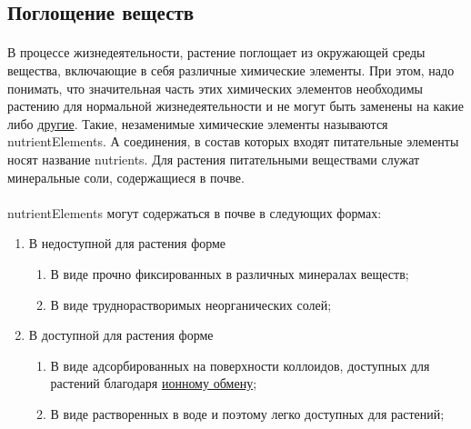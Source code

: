 \subsection*{Поглощение веществ}

\paragraph*{}В процессе жизнедеятельности, растение поглощает из окружающей среды вещества, включающие в себя различные химические элементы. При этом, надо понимать, что значительная часть этих химических элементов необходимы растению для нормальной жизнедеятельности и не могут быть заменены на какие либо \hyperlink{libihBarell}{другие}. Такие, незаменимые химические элементы называются \gls{nutrientElements}. А соединения, в состав которых входят питательные элементы носят название \gls{nutrients}. Для растения питательными веществами служат минеральные соли, содержащиеся в почве.

\paragraph*{}\gls{nutrientElements} могут содержаться в почве в следующих формах: 

\begin{enumerate}

\item В недоступной для растения форме

	\begin{enumerate}

		\item В виде прочно фиксированных в различных минералах веществ; 
		\item В виде труднорастворимых неорганических солей; 

	\end{enumerate}
	
\item В доступной для растения форме

	\begin{enumerate}

		\item В виде адсорбированных на поверхности коллоидов, доступных для растений благодаря \hyperlink{contact_exchanging}{ионному обмену};
		\item В виде растворенных в воде и поэтому легко доступных для растений;

	\end{enumerate}

\end{enumerate}

